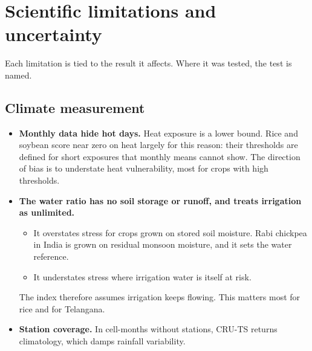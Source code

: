 \section{Scientific limitations and uncertainty}\label{sec:limits}
Each limitation is tied to the result it affects. Where it was tested, the test is named.

\subsection{Climate measurement}
\begin{itemize}
\item \textbf{Monthly data hide hot days.} Heat exposure is a lower bound. Rice and soybean score near zero on heat
largely for this reason: their thresholds are defined for short exposures that monthly means cannot show. The
direction of bias is to understate heat vulnerability, most for crops with high thresholds.
\item \textbf{The water ratio has no soil storage or runoff, and treats irrigation as unlimited.}
  \begin{itemize}
  \item It overstates stress for crops grown on stored soil moisture. Rabi chickpea in India is grown on residual
  monsoon moisture, and it sets the water reference.
  \item It understates stress where irrigation water is itself at risk.
  \end{itemize}
  The index therefore assumes irrigation keeps flowing. This matters most for rice and for Telangana.
\item \textbf{Station coverage.} In cell-months without stations, CRU-TS returns climatology, which damps rainfall
variability.
\end{itemize}

